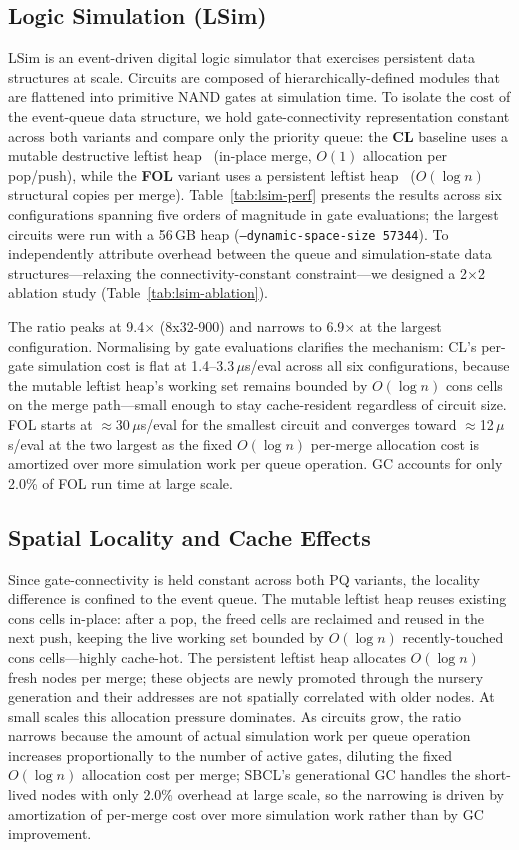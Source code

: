 \documentclass[sigconf,nonacm]{acmart}
\begin{document}
\subsection{Logic Simulation (LSim)}
\label{sec:simbench}
LSim is an event-driven digital logic simulator that exercises persistent data structures at scale. Circuits are composed of hierarchically-defined modules that are flattened into primitive NAND gates at simulation time. To isolate the cost of the event-queue data structure, we hold gate-connectivity representation constant across both variants and compare only the priority queue: the \textbf{CL} baseline uses a mutable destructive leftist heap~\cite{Crane1972} (in-place merge, $O(1)$ allocation per pop/push), while the \textbf{FOL} variant uses a persistent leftist heap~\cite{Okasaki1998} ($O(\log n)$ structural copies per merge). Table~\ref{tab:lsim-perf} presents the results across six configurations spanning five orders of magnitude in gate evaluations; the largest circuits were run with a 56\,GB heap (\texttt{--dynamic-space-size~57344}). To independently attribute overhead between the queue and simulation-state data structures---relaxing the connectivity-constant constraint---we designed a 2$\times$2 ablation study (Table~\ref{tab:lsim-ablation}).

The ratio peaks at 9.4$\times$ (8x32-900) and narrows to 6.9$\times$ at the largest configuration. Normalising by gate evaluations clarifies the mechanism: CL's per-gate simulation cost is flat at 1.4--3.3\,$\mu$s/eval across all six configurations, because the mutable leftist heap's working set remains bounded by $O(\log n)$ cons cells on the merge path---small enough to stay cache-resident regardless of circuit size. FOL starts at ${\approx}$30\,$\mu$s/eval for the smallest circuit and converges toward ${\approx}$12\,$\mu$s/eval at the two largest as the fixed $O(\log n)$ per-merge allocation cost is amortized over more simulation work per queue operation. GC accounts for only 2.0\% of FOL run time at large scale.

\subsection{Spatial Locality and Cache Effects}
Since gate-connectivity is held constant across both PQ variants, the locality difference is confined to the event queue. The mutable leftist heap reuses existing cons cells in-place: after a pop, the freed cells are reclaimed and reused in the next push, keeping the live working set bounded by $O(\log n)$ recently-touched cons cells---highly cache-hot. The persistent leftist heap allocates $O(\log n)$ fresh nodes per merge; these objects are newly promoted through the nursery generation and their addresses are not spatially correlated with older nodes. At small scales this allocation pressure dominates. As circuits grow, the ratio narrows because the amount of actual simulation work per queue operation increases proportionally to the number of active gates, diluting the fixed $O(\log n)$ allocation cost per merge; SBCL's generational GC handles the short-lived nodes with only 2.0\% overhead at large scale, so the narrowing is driven by amortization of per-merge cost over more simulation work rather than by GC improvement.
\end{document}
